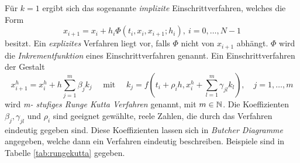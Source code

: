 Für $k=1$ ergibt sich das sogenannte \textit{implizite} Einschrittverfahren, welches die Form
\[
 x_{i+1} = x_i + h_i \Phi (t_i,x_i,x_{i+1};h_i), ~ i=0,\ldots, N-1
\]
besitzt.
Ein \textit{explizites} Verfahren liegt vor, falls $\Phi$ nicht von $x_{i+1}$ abhängt. $\Phi$ wird die \textit{Inkrementfunktion} eines Einschrittverfahren genannt.
Ein Einschrittverfahren der Gestalt 
\[
 x_{i+1}^h = x_i^h + h\sum_{j=1}^m \beta_j k_j \quad \text{ mit } \quad k_j  = f(t_i+ \rho_ih, x_i^h + \sum_{l=1}^m \gamma_{jl} k_l ), \quad j=1,\ldots,m
\]
wird \textit{m- stufiges Runge Kutta Verfahren} genannt, mit $m\in \mathbb{N}$. Die Koeffizienten $\beta_j,\gamma_{jl}$ und $\rho_i$ sind geeignet gewählte, reele Zahlen, die durch das Verfahren eindeutig gegeben sind. Diese Koeffizienten lassen sich in \textit{Butcher Diagramme} angegeben, welche dann ein Verfahren eindeutig beschreiben. Beispiele sind in Tabelle \ref{tab:rungekutta} gegeben.

